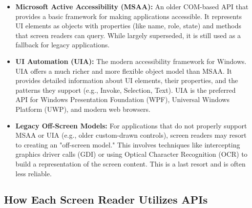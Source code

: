 \begin{itemize}
	\item \textbf{Microsoft Active Accessibility (MSAA):} An older COM-based API that provides a basic framework for making applications accessible. It represents UI elements as objects with properties (like name, role, state) and methods that screen readers can query. While largely superseded, it is still used as a fallback for legacy applications.
	\item \textbf{UI Automation (UIA):} The modern accessibility framework for Windows. UIA offers a much richer and more flexible object model than MSAA. It provides detailed information about UI elements, their properties, and the patterns they support (e.g., Invoke, Selection, Text). UIA is the preferred API for Windows Presentation Foundation (WPF), Universal Windows Platform (UWP), and modern web browsers.
	\item \textbf{Legacy Off-Screen Models:} For applications that do not properly support MSAA or UIA (e.g., older custom-drawn controls), screen readers may resort to creating an "off-screen model." This involves techniques like intercepting graphics driver calls (GDI) or using Optical Character Recognition (OCR) to build a representation of the screen content. This is a last resort and is often less reliable.
\end{itemize}

\subsection{How Each Screen Reader Utilizes APIs}
\label{sub:how-each-screen-reader-utilizes-apis}

